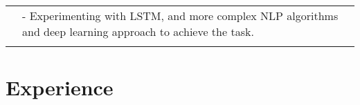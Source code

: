 \documentclass[a4paper,10pt]{extarticle} %
\begin{document}
\begin{tabular}{r|p{18cm}}
& \footnotesize{- Experimenting with LSTM, and more complex NLP algorithms and deep learning approach to achieve the task.}\\
\multicolumn{2}{c}{} \\

\end{tabular}




\section{Experience}
\end{document}
